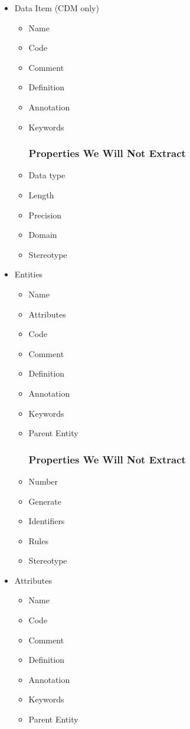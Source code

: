\documentclass[12pt,a4paper]{report}
\begin{document}
\begin{itemize}
	\item Data Item (CDM only)
	\begin{itemize}
		\item Name
		\item Code 
		\item Comment
		\item Definition
		\item Annotation
		\item Keywords
		\subsubsection{Properties We Will Not Extract}
		\item Data type
		\item Length
		\item Precision
		\item Domain
		\item Stereotype
	\end{itemize}
	\item Entities
	\begin{itemize}
		\item Name 
		\item Attributes
		\item Code 
		\item Comment
		\item Definition
		\item Annotation
		\item Keywords
		\item Parent Entity
		\subsubsection{Properties We Will Not Extract}
		\item Number
		\item Generate
		\item Identifiers
		\item Rules
		\item Stereotype
	\end{itemize}
	\item Attributes
	\begin{itemize}
		\item Name 
		\item Code 
		\item Comment
		\item Definition
		\item Annotation
		\item Keywords
		\item Parent Entity

\end{itemize}
\end{itemize}
\end{document}
